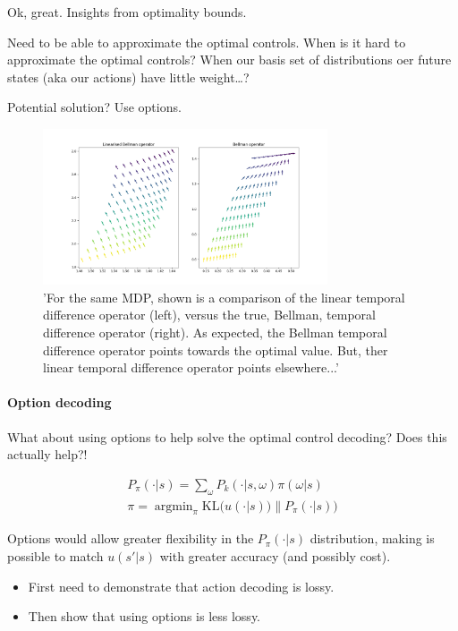 Ok, great. Insights from optimality bounds.

Need to be able to approximate the optimal controls. When is it hard to
approximate the optimal controls? When our basis set of distributions
oer future states (aka our actions) have little weight\ldots{}?

Potential solution? Use options.

\begin{figure}
\centering
\includegraphics[width=0.75\textwidth,height=0.5\textheight]{../../pictures/figures/LBO_BO.png}
\caption{'For the same MDP, shown is a comparison of the linear temporal difference operator (left), versus the true, Bellman, temporal difference operator (right). As expected, the Bellman temporal difference operator points towards the optimal value. But, ther linear temporal difference operator points elsewhere...'}
\end{figure}

\hypertarget{option-decoding}{%
\paragraph{Option decoding}\label{option-decoding}}

What about using options to help solve the optimal control decoding?
Does this actually help?!

\begin{align}
P_{\pi}(\cdot | s) = \sum_\omega P_k(\cdot | s, \omega) \pi(\omega | s) \\
\pi = \mathop{\text{argmin}}_{\pi} \text{KL}\Big(u(\cdot | s))\parallel P_{\pi}(\cdot | s)\Big)
\end{align}

Options would allow greater flexibility in the \(P_{\pi}(\cdot | s)\)
distribution, making is possible to match \(u(s'|s)\) with greater
accuracy (and possibly cost).

\begin{itemize}
\tightlist
\item
  First need to demonstrate that action decoding is lossy.
\item
  Then show that using options is less lossy.
\end{itemize}

